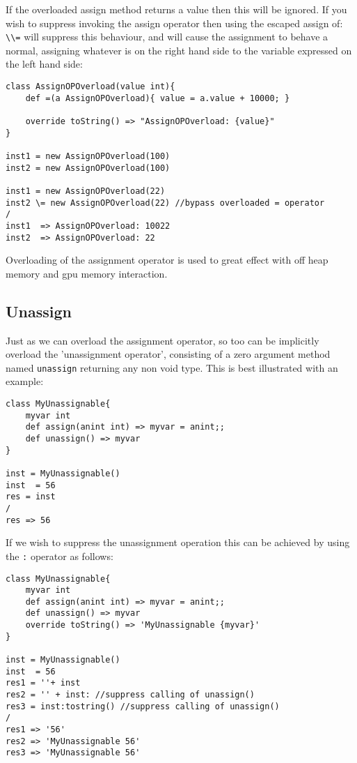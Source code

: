 \documentclass[conc-doc]{subfiles}
\begin{document}
If the overloaded assign method returns a value then this will be ignored. If you wish to suppress invoking the assign operator then using the escaped assign of: \lstinline{\\=} will suppress this behaviour, and will cause the assignment to behave a normal, assigning whatever is on the right hand side to the variable expressed on the left hand side:
\begin{lstlisting}
class AssignOPOverload(value int){	
	def =(a AssignOPOverload){ value = a.value + 10000; }
	
	override toString() => "AssignOPOverload: {value}"
}

inst1 = new AssignOPOverload(100)
inst2 = new AssignOPOverload(100)

inst1 = new AssignOPOverload(22)
inst2 \= new AssignOPOverload(22) //bypass overloaded = operator
/
inst1  => AssignOPOverload: 10022
inst2  => AssignOPOverload: 22
\end{lstlisting}

Overloading of the assignment operator is used to great effect with off heap memory and gpu memory interaction.

\subsection{Unassign}
Just as we can overload the assignment operator, so too can be implicitly overload the 'unassignment operator', consisting of a zero argument method named \lstinline{unassign} returning any non void type. This is best illustrated with an example:
\begin{lstlisting}
class MyUnassignable{
	myvar int
	def assign(anint int) => myvar = anint;;
	def unassign() => myvar
}

inst = MyUnassignable()
inst  = 56
res = inst 
/
res => 56
\end{lstlisting}

If we wish to suppress the unassignment operation this can be achieved by using the \lstinline{:} operator as follows:

\begin{lstlisting}
class MyUnassignable{
	myvar int
	def assign(anint int) => myvar = anint;;
	def unassign() => myvar
	override toString() => 'MyUnassignable {myvar}'
}

inst = MyUnassignable()
inst  = 56
res1 = ''+ inst 
res2 = '' + inst: //suppress calling of unassign()
res3 = inst:tostring() //suppress calling of unassign()
/
res1 => '56'
res2 => 'MyUnassignable 56'
res3 => 'MyUnassignable 56'
\end{lstlisting}
\end{document}
